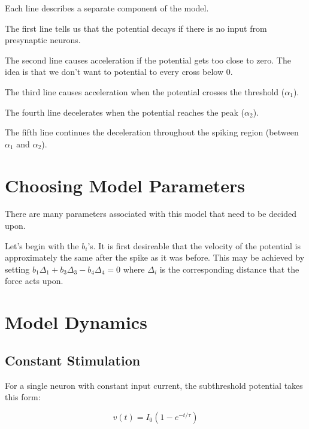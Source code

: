 \documentclass[a4paper]{article}
\begin{document}
Each line describes a separate component of the model. 

The first line tells us that the potential decays if there is no input from presynaptic neurons.

The second line causes acceleration if the potential gets too close to zero. The idea is that we don't want to potential to every cross below 0.

The third line causes acceleration when the potential crosses the threshold ($\alpha_1$).

The fourth line decelerates when the potential reaches the peak ($\alpha_2$).

The fifth line continues the deceleration throughout the spiking region (between $\alpha_1$ and $\alpha_2$).

\section{Choosing Model Parameters}

There are many parameters associated with this model that need to be decided upon.

Let's begin with the $b_i$'s. It is first desireable that the velocity of the potential is approximately the same after the spike as it was before. This may be achieved by setting $b_1 \Delta_1 + b_3 \Delta_3 - b_4 \Delta_4 = 0$ where $\Delta_i$ is the corresponding distance that the force acts upon.


\section{Model Dynamics}
\subsection{Constant Stimulation}

For a single neuron with constant input current, the subthreshold potential takes this form:

$$
v(t) = I_0 (1 - e^{-t / \tau})
$$
\end{document}
